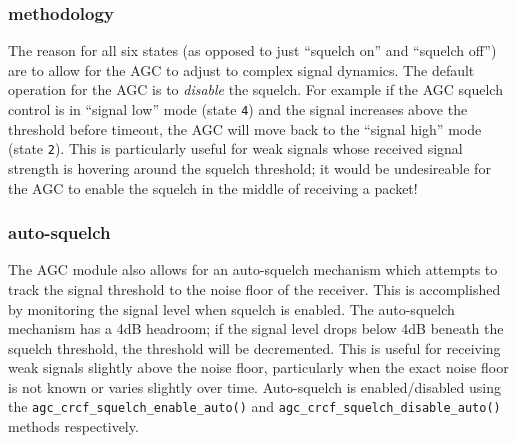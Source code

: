 \subsubsection{methodology}
The reason for all six states (as opposed to just ``squelch on'' and ``squelch
off'') are to allow for the AGC to adjust to complex signal dynamics.
The default operation for the AGC is to {\it disable} the squelch.
For example if the AGC squelch control is in ``signal low'' mode
(state {\tt 4}) and the signal increases above the threshold before timeout,
the AGC will move back to the ``signal high'' mode (state {\tt 2}).
This is particularly useful for weak signals whose received signal strength is
hovering around the squelch threshold; it would be undesireable for the AGC to
enable the squelch in the middle of receiving a packet!

\subsubsection{auto-squelch}
The AGC module also allows for an auto-squelch mechanism which attempts to
track the signal threshold to the noise floor of the receiver.
This is accomplished by monitoring the signal level when squelch is enabled.
The auto-squelch mechanism has a 4dB headroom; if the signal level drops below
4dB beneath the squelch threshold, the threshold will be decremented.
This is useful for receiving weak signals slightly above the noise floor,
particularly when the exact noise floor is not known or varies slightly over
time.
Auto-squelch is enabled/disabled using the
{\tt agc\_crcf\_squelch\_enable\_auto()} and 
{\tt agc\_crcf\_squelch\_disable\_auto()} methods respectively.

